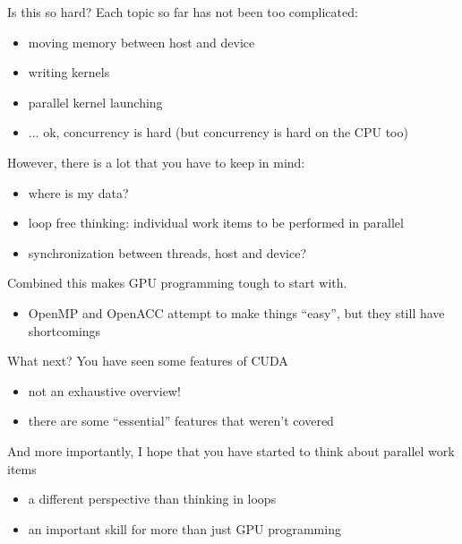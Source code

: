 
\begin{frame}[fragile]{}
    \begin{info}{Is this so hard?}
        Each topic so far has not been too complicated:
        \begin{itemize}
            \item moving memory between host and device
            \item writing kernels
            \item parallel kernel launching
            \item ... ok, concurrency is hard (but concurrency is hard on the CPU too)
        \end{itemize}
        However, there is a lot that you have to keep in mind:
        \begin{itemize}
            \item where is my data?
            \item loop free thinking: individual work items to be performed in parallel
            \item synchronization between threads, host and device?
        \end{itemize}
        Combined this makes GPU programming tough to start with.
        \begin{itemize}
            \item OpenMP and OpenACC attempt to make things ``easy'', but they still have shortcomings
        \end{itemize}
    \end{info}

\end{frame}

\begin{frame}[fragile]{}
    \begin{info}{What next?}
        You have seen some features of CUDA
        \begin{itemize}
            \item not an exhaustive overview!
            \item there are some ``essential'' features that weren't covered
        \end{itemize}
        And more importantly, I hope that you have started to think about parallel work items
        \begin{itemize}
            \item a different perspective than thinking in loops
            \item an important skill for more than just GPU programming
        \end{itemize}
    \end{info}

\end{frame}

